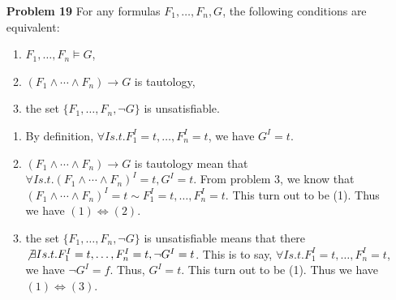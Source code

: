 \documentclass[12pt]{article}
\begin{document}
\begin{enumerate}
\item[\textbf{Problem 19}] For any formulas $F_1, \ldots, F_n, G$, the following conditions are equivalent:
\begin{enumerate}[(1)]
\item $F_1, \ldots, F_n \models G$, 
\item $(F_1 \wedge \cdots \wedge F_n) \rightarrow G$ is tautology, 
\item the set $\{F_1, \ldots, F_n, \neg G \}$ is unsatisfiable. 
\end{enumerate}
\begin{enumerate}[(1)]
\item By definition, $\forall I s.t. F_1^I = t, \ldots, F_n^I = t$, we have $G^I = t$. 
\item $(F_1 \wedge \cdots \wedge F_n) \rightarrow G$ is tautology mean that $\forall I s.t. (F_1 \wedge \cdots \wedge F_n)^I = t, G^I = t$. From problem 3, we know that $(F_1 \wedge \cdots \wedge F_n)^I = t \sim F_1^I = t, \ldots, F_n^I = t$. This turn out to be (1). Thus we have $(1) \Longleftrightarrow (2)$. 
\item the set $\{F_1, \ldots, F_n, \neg G \}$ is unsatisfiable means that there $\not \exists I s.t. F_1^I = t, \ldots, F_n^I = t, \neg G^I = t$. This is to say, $\forall I s.t. F_1^I = t, \ldots, F_n^I = t$, we have $\neg G^I = f$. Thus, $G^I = t$. This turn out to be (1). Thus we have $(1) \Longleftrightarrow (3)$. 

\end{enumerate}





\end{enumerate}
\end{document}
